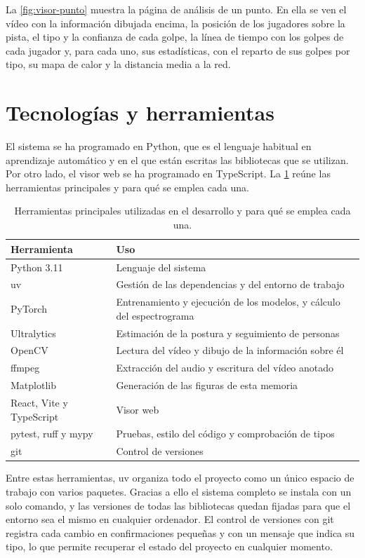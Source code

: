 La \cref{fig:visor-punto} muestra la página de análisis de un punto.
En ella se ven el vídeo con la información dibujada encima, la posición de los jugadores sobre la pista, el tipo y la confianza de cada golpe, la línea de tiempo con los golpes de cada jugador y, para cada uno, sus estadísticas, con el reparto de sus golpes por tipo, su mapa de calor y la distancia media a la red.

\section{Tecnologías y herramientas}
\label{sec:tecnologias}

El sistema se ha programado en Python, que es el lenguaje habitual en aprendizaje automático y en el que están escritas las bibliotecas que se utilizan.
Por otro lado, el visor web se ha programado en TypeScript.
La \cref{tab:tecnologias} reúne las herramientas principales y para qué se emplea cada una.

\begin{table}[htbp]
  \centering
  \caption{Herramientas principales utilizadas en el desarrollo y para qué se emplea cada una.}
  \label{tab:tecnologias}
  \small
  \begin{tabular}{p{4.2cm}p{10.4cm}}
    \toprule
    Herramienta & Uso \\
    \midrule
    Python 3.11 & Lenguaje del sistema \\
    uv & Gestión de las dependencias y del entorno de trabajo \\
    PyTorch & Entrenamiento y ejecución de los modelos, y cálculo del espectrograma \\
    Ultralytics & Estimación de la postura y seguimiento de personas \\
    OpenCV & Lectura del vídeo y dibujo de la información sobre él \\
    ffmpeg & Extracción del audio y escritura del vídeo anotado \\
    Matplotlib & Generación de las figuras de esta memoria \\
    React, Vite y TypeScript & Visor web \\
    pytest, ruff y mypy & Pruebas, estilo del código y comprobación de tipos \\
    git & Control de versiones \\
    \bottomrule
  \end{tabular}
\end{table}

Entre estas herramientas, uv organiza todo el proyecto como un único espacio de trabajo con varios paquetes.
Gracias a ello el sistema completo se instala con un solo comando, y las versiones de todas las bibliotecas quedan fijadas para que el entorno sea el mismo en cualquier ordenador.
El control de versiones con git registra cada cambio en confirmaciones pequeñas y con un mensaje que indica su tipo, lo que permite recuperar el estado del proyecto en cualquier momento.

